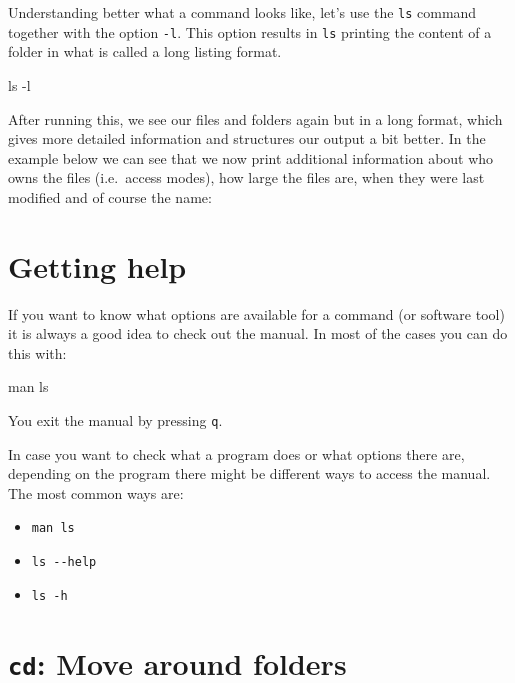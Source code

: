 \documentclass[
  letterpaper,
  DIV=11,
  numbers=noendperiod]{scrreprt}
\newenvironment{Shaded}{}{}
\newcommand{\AttributeTok}[1]{\textcolor[rgb]{0.84,0.23,0.29}{#1}}
\newcommand{\FunctionTok}[1]{\textcolor[rgb]{0.44,0.26,0.76}{#1}}
\newcommand{\NormalTok}[1]{\textcolor[rgb]{0.14,0.16,0.18}{#1}}
\providecommand{\tightlist}{%
  \setlength{\itemsep}{0pt}\setlength{\parskip}{0pt}}\usepackage{longtable,booktabs,array}
\begin{document}
Understanding better what a command looks like, let's use the
\texttt{ls} command together with the option \texttt{-l}. This option
results in \texttt{ls} printing the content of a folder in what is
called a long listing format.

\begin{Shaded}
\begin{Highlighting}[]
\FunctionTok{ls} \AttributeTok{{-}l}
\end{Highlighting}
\end{Shaded}

After running this, we see our files and folders again but in a long
format, which gives more detailed information and structures our output
a bit better. In the example below we can see that we now print
additional information about who owns the files (i.e.~access modes), how
large the files are, when they were last modified and of course the
name:

\section{Getting help}\label{getting-help}

If you want to know what options are available for a command (or
software tool) it is always a good idea to check out the manual. In most
of the cases you can do this with:

\begin{Shaded}
\begin{Highlighting}[]
\FunctionTok{man}\NormalTok{ ls}
\end{Highlighting}
\end{Shaded}

You exit the manual by pressing \texttt{q}.

In case you want to check what a program does or what options there are,
depending on the program there might be different ways to access the
manual. The most common ways are:

\begin{itemize}
\tightlist
\item
  \texttt{man\ ls}
\item
  \texttt{ls\ -\/-help}
\item
  \texttt{ls\ -h}
\end{itemize}

\section{\texorpdfstring{\texttt{cd}: Move around
folders}{cd: Move around folders}}\label{cd-move-around-folders}
\end{document}
